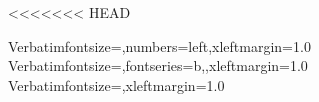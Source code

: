 <<<<<<< HEAD
\newcommand{\ccode}[1]{{\smaller\texttt{#1}}}
\newcommand{\ccodeincmd}[1]{{\texttt{#1}}}
\newcommand{\emcode}[1]{{\smaller\texttt{\textbf{#1}}}}
\newcommand{\itcode}[1]{{\smaller\texttt{\textit{#1}}}}
\newcommand{\itbfcode}[1]{{\smaller\texttt{\textit{\bfseries #1}}}}
\newcommand{\esldef}[1]{\textbf{#1}}                    %
\newcommand{\prog}[1]{{\smaller\textsc{#1}}}
\newcommand{\eslmod}[1]{{\smaller\textsf{\textup{\textbf{#1}}}}}
\newcommand{\eslmodincmd}[1]{{\smaller\textsf{\textup{\textbf{#1}}}}}
\newcommand{\user}[1]{\indent\indent{\small\bfseries\texttt{> #1}}}
\newcommand{\response}[1]{\indent\indent{\small\texttt{#1}}}

\newcommand{\Easel}    {Easel}
\newcommand{\HMMER}    {HMMER}
\newcommand{\Infernal} {Infernal}
\newcommand{\Pfam}     {Pfam}
\newcommand{\Rfam}     {Rfam}

\newcommand{\apisubhead}[1]{\multicolumn{2}{|c|}{\rule[-0.4em]{0em}{1.5em}\textbf{#1}}}

\def\argmax{\mathop{\mathrm{argmax}}\limits}
\def\argmin{\mathop{\mathrm{argmin}}\limits}

       {Verbatim}{fontsize=\scriptsize,numbers=left,xleftmargin=1.0\parindent}%
    {Verbatim}{fontsize=\small,fontseries=b,,xleftmargin=1.0\parindent}%
%
     {Verbatim}{fontsize=\scriptsize,xleftmargin=1.0\parindent}%

\renewcommand{\theFancyVerbLine}{\tiny\textcolor{SkyBlue}{\arabic{FancyVerbLine}}}


%
\newenvironment{sreapi}{%
     \begin{list}{}{%
       \renewcommand{\makelabel}[1]{%
         \begin{minipage}{\textwidth}%
           \hangindent10em\hangafter1\noindent%
           {\bfseries\texttt{##1}\vspace{0.8em}}%
         \end{minipage}%
     }}}%
     {\end{list}}


